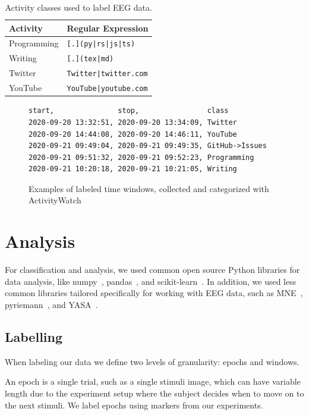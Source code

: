 \begin{table}[h]
    \centering
    \begin{tabular}{ll}
        \toprule
        \textbf{Activity} & \textbf{Regular Expression} \\
        \midrule
        Programming & \texttt{[.](py|rs|js|ts)} \\
        Writing & \texttt{[.](tex|md)} \\
        Twitter & \texttt{Twitter|twitter.com} \\
        YouTube & \texttt{YouTube|youtube.com} \\
        \bottomrule
    \end{tabular}
    \caption{Activity classes used to label EEG data.}\label{table:activity-classes}
\end{table}

\begin{figure}[h]
\begin{verbatim}
start,               stop,                class
2020-09-20 13:32:51, 2020-09-20 13:34:09, Twitter
2020-09-20 14:44:08, 2020-09-20 14:46:11, YouTube
2020-09-21 09:49:04, 2020-09-21 09:49:35, GitHub->Issues
2020-09-21 09:51:32, 2020-09-21 09:52:23, Programming
2020-09-21 10:20:18, 2020-09-21 10:21:05, Writing
\end{verbatim}
    \caption{Examples of labeled time windows, collected and categorized with ActivityWatch}\label{code:class-csv}
\end{figure}

\vfill
\pagebreak
\section{Analysis}

    For classification and analysis, we used common open source Python libraries for data analysis, like numpy~\cite{harris2020array}, pandas~\cite{reback2020pandas}, and scikit-learn~\cite{scikit-learn}. In addition, we used less common libraries tailored specifically for working with EEG data, such as MNE~\cite{noauthor_mne-python_2020}, pyriemann~\cite{alexandre_barachant_2020_3715511}, and YASA~\cite{vallat_yasa_2020}.

    \subsection{Labelling}
        When labeling our data we define two levels of granularity: epochs and windows.

        An epoch is a single trial, such as a single stimuli image, which can have variable length due to the experiment setup where the subject decides when to move on to the next stimuli. We label epochs using markers from our experiments.

